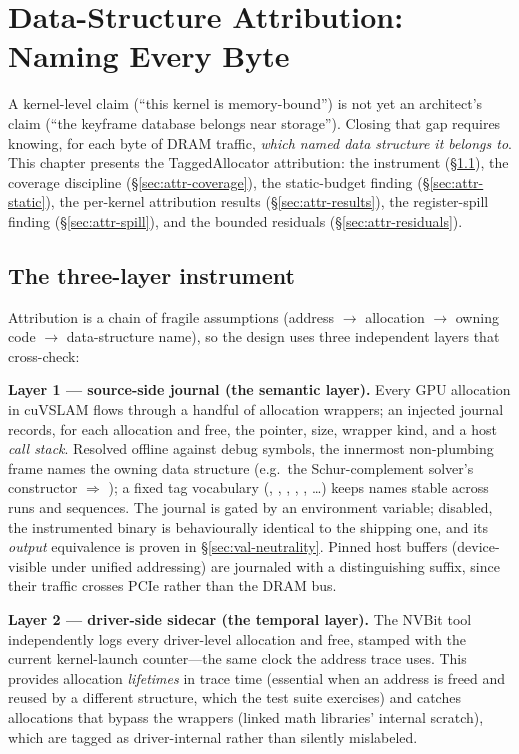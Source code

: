 \chapter{Data-Structure Attribution: Naming Every Byte}
\label{ch:attribution}

A kernel-level claim (``this kernel is memory-bound'') is not yet an
architect's claim (``the keyframe database belongs near storage''). Closing
that gap requires knowing, for each byte of DRAM traffic, \emph{which named
data structure it belongs to}. This chapter presents the TaggedAllocator
attribution: the instrument (\S\ref{sec:attr-design}), the coverage
discipline (\S\ref{sec:attr-coverage}), the static-budget finding
(\S\ref{sec:attr-static}), the per-kernel attribution results
(\S\ref{sec:attr-results}), the register-spill finding
(\S\ref{sec:attr-spill}), and the bounded residuals
(\S\ref{sec:attr-residuals}).

\section{The three-layer instrument}
\label{sec:attr-design}

Attribution is a chain of fragile assumptions (address $\rightarrow$
allocation $\rightarrow$ owning code $\rightarrow$ data-structure name), so
the design uses three independent layers that cross-check:

\textbf{Layer 1 --- source-side journal (the semantic layer).} Every GPU
allocation in cuVSLAM flows through a handful of allocation wrappers; an
injected journal records, for each allocation and free, the pointer, size,
wrapper kind, and a host \emph{call stack}. Resolved offline against debug
symbols, the innermost non-plumbing frame names the owning data structure
(e.g.\ the Schur-complement solver's constructor $\Rightarrow$
); a fixed tag vocabulary
(, , ,
, , \ldots) keeps names
stable across runs and sequences. The journal is gated by an environment
variable; disabled, the instrumented binary is behaviourally identical to
the shipping one, and its \emph{output} equivalence is proven in
\S\ref{sec:val-neutrality}. Pinned host buffers (device-visible under
unified addressing) are journaled with a distinguishing suffix, since their
traffic crosses PCIe rather than the DRAM bus.

\textbf{Layer 2 --- driver-side sidecar (the temporal layer).} The NVBit
tool independently logs every driver-level allocation and free, stamped
with the current kernel-launch counter---the same clock the address trace
uses. This provides allocation \emph{lifetimes} in trace time (essential
when an address is freed and reused by a different structure, which the
test suite exercises) and catches allocations that bypass the wrappers
(linked math libraries' internal scratch), which are tagged as
driver-internal rather than silently mislabeled.

